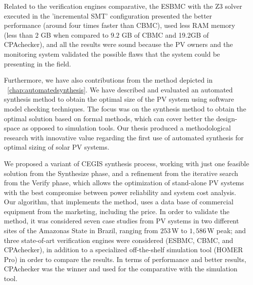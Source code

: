 %
Related to the verification engines comparative, the ESBMC with the Z3 solver executed in the 'incremental SMT' configuration presented the better performance (around four times faster than CBMC), used less RAM memory (less than $2$ GB when compared to $9.2$ GB of CBMC and 19.2GB of CPAchecker), and all the results were sound because the PV owners and the monitoring system validated the possible flaws that the system could be presenting in the field.

Furthermore, we have also contributions from the method depicted in ~\autoref{chap:automatedsynthesis}. We have described and evaluated an automated synthesis method to obtain the optimal size of the PV system using software model checking techniques. The focus was on the synthesis method to obtain the optimal solution based on formal methods, which can cover better the design-space as opposed to simulation tools. Our thesis produced a methodological research with innovative value regarding the first use of automated synthesis for optimal sizing of solar PV systems.

We proposed a variant of CEGIS synthesis process, working with just one feasible solution from the {\sc Synthesize} phase, and a refinement from the iterative search from the {\sc Verify} phase, which allows the optimization of stand-alone PV systems with the best compromise between power reliability and system cost analysis. Our algorithm, that implements the method, uses a data base of commercial equipment from the marketing, including the price. In order to validate the method, it was considered seven case studies from PV systems in two different sites of the Amazonas State in Brazil, ranging from $253$\,W to $1,586$\,W peak; and three state-of-art verification engines were considered (ESBMC, CBMC, and CPAchecker), in addition to a specialized off-the-shelf simulation tool (HOMER Pro) in order to compare the results. In terms of performance and better results, CPAchecker was the winner and used for the comparative with the simulation tool. 

